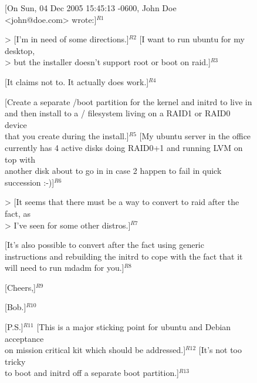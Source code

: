 \begin{figure}
%
\small
[On Sun, 04 Dec 2005 15:45:13 -0600, John Doe\\
<john@doe.com> wrote:]$^{R1}$\vspace{0.1cm}

> [I'm in need of some directions.]$^{R2}$  [I want to run ubuntu for my desktop,\\
> but the installer doesn't support root or boot on raid.]$^{R3}$\vspace{0.1cm}

[It claims not to. It actually does work.]$^{R4}$\vspace{0.1cm}

[Create a separate /boot partition for the kernel and initrd to live in\\
and then install to a / filesystem living on a RAID1 or RAID0 device\\
that you create during the install.]$^{R5}$ [My ubuntu server in the office\\
currently has 4 active disks doing RAID0+1 and running LVM on top with\\
another disk about to go in in case 2 happen to fail in quick\\
succession :-)]$^{R6}$\vspace{0.1cm}

> [It seems that there must be a way to convert to raid after the fact, as\\
> I've seen for some other distros.]$^{R7}$\vspace{0.1cm}

[It's also possible to convert after the fact using generic\\
instructions and rebuilding the initrd to cope with the fact that it\\
will need to run mdadm for you.]$^{R8}$\vspace{0.1cm}

[Cheers,]$^{R9}$\vspace{0.1cm}

[Bob.]$^{R10}$\vspace{0.1cm}

[P.S.]$^{R11}$ [This is a major sticking point for ubuntu and Debian acceptance\\
on mission critical kit which should be addressed.]$^{R12}$ [It's not too tricky\\
to boot and initrd off a separate boot partition.]$^{R13}$\vspace{0.1cm}
\caption{}
\label{}
\end{figure}


